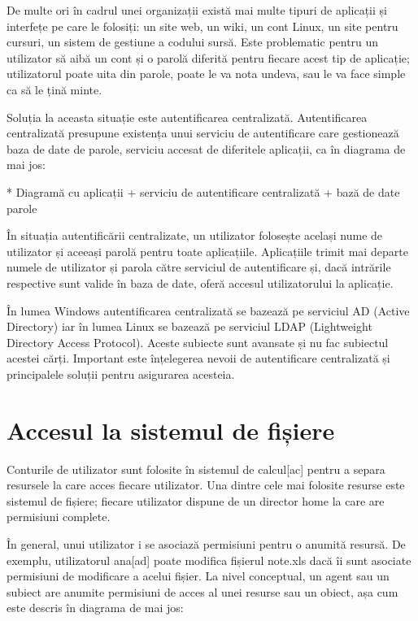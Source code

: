De multe ori în cadrul unei organizații există mai multe tipuri de aplicații și
interfețe pe care le folosiți: un site web, un wiki, un cont Linux, un site
pentru cursuri, un sistem de gestiune a codului sursă. Este problematic pentru
un utilizator să aibă un cont și o parolă diferită pentru fiecare acest tip de
aplicație; utilizatorul poate uita din parole, poate le va nota undeva, sau le
va face simple ca să le țină minte.

Soluția la aceasta situație este autentificarea centralizată. Autentificarea
centralizată presupune existența unui serviciu de autentificare care gestionează
baza de date de parole, serviciu accesat de diferitele aplicații, ca în diagrama
de mai jos:

* Diagramă cu aplicații + serviciu de autentificare centralizată + bază de date parole

În situația autentificării centralizate, un utilizator folosește același nume de
utilizator și aceeași parolă pentru toate aplicațiile. Aplicațiile trimit mai
departe numele de utilizator și parola către serviciul de autentificare și, dacă
intrările respective sunt valide în baza de date, oferă accesul utilizatorului
la aplicație.

În lumea Windows autentificarea centralizată se bazează pe serviciul AD (Active
Directory) iar în lumea Linux se bazează pe serviciul LDAP (Lightweight
Directory Access Protocol). Aceste subiecte sunt avansate și nu fac subiectul
acestei cărți. Important este înțelegerea nevoii de autentificare centralizată
și principalele soluții pentru asigurarea acesteia.

\section{Accesul la sistemul de fișiere}
\label{sec:users-fs}

Conturile de utilizator sunt folosite în sistemul de calcul[ac] pentru a separa
resursele la care acces fiecare utilizator. Una dintre cele mai folosite resurse
este sistemul de fișiere; fiecare utilizator dispune de un director home la care
are permisiuni complete.

În general, unui utilizator i se asociază permisiuni pentru o anumită resursă.
De exemplu, utilizatorul ana[ad] poate modifica fișierul note.xls dacă îi sunt
asociate permisiuni de modificare a acelui fișier. La nivel conceptual, un agent
sau un subiect are anumite permisiuni de acces al unei resurse sau un obiect,
așa cum este descris în diagrama de mai jos:

